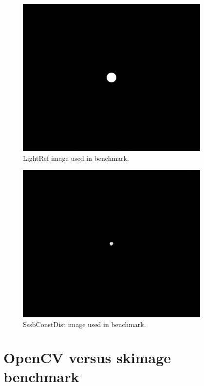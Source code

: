 \begin{figure}[htb]
    \begin{center}
        \includegraphics[height=8cm]{doc/thesis/0_figures/cv_skimage/LightRef_2017-08-15T115851-679000.jpg}
    \end{center}
    \caption{LightRef image used in benchmark.}
    \label{fig:bm_light_ref}
\end{figure}

\begin{figure}[htb]
    \begin{center}
        \includegraphics[height=8cm]{doc/thesis/0_figures/cv_skimage/SssbConstDist_2017-08-15T115851-679000.jpg}
    \end{center}
    \caption{SssbConstDist image used in benchmark.}
    \label{fig:bm_sssbconstdist}
\end{figure}

\section{OpenCV versus \gls{skimage} benchmark} \label{sec:app_cvskimage}

